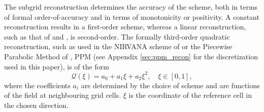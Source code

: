\documentclass[11pt,a4paper]{article}
\begin{document}
The subgrid reconstruction determines the accuracy of the scheme, both in terms of formal order-of-accuracy and in terms of monotonicity or positivity. A constant reconstruction results in a first-order scheme, whereas a linear reconstruction, such as that of \citet{fromm1968method} and \citet{van1974towards}, is second-order. The formally third-order quadratic reconstruction, such as used in the NIRVANA scheme of \citet{leonard1995nirvana} or the Piecewise Parabolic Method of \citet{colella1984ppm}, PPM (see Appendix \ref{sec:ppm_recon} for the discretization used in this paper),  is of the form
\begin{equation} \label{eqn:quad_coef}
    \mathcal{Q}(\xi) = a_0 + a_1 \xi + a_2 \xi^2, \quad \xi \in [0, 1],
\end{equation}
where the coefficients $a_i$ are determined by the choice of scheme and are functions of the field at neighbouring grid cells. $\xi$ is the coordinate of the reference cell in the chosen direction. 
\end{document}
